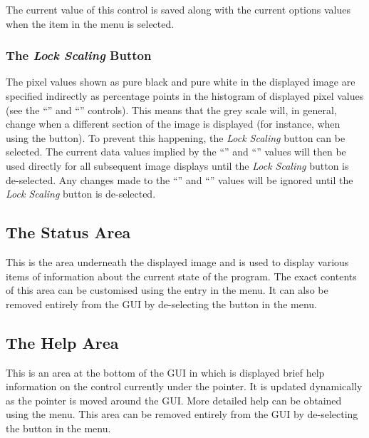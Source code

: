 The current value of this control is saved along with the current options
values when the  item in
the  menu is selected.

\subsubsection {The {\em Lock Scaling} Button}
The pixel values shown as pure black and pure white in the displayed
image are specified indirectly as percentage points in the histogram of
displayed pixel values (see the ``'' and ``''
controls). This means that the grey scale will, in general, change when a
different section of the image is displayed (for instance, when using the
 button). To prevent this happening, the
{\em Lock Scaling} button can be selected. The current data values
implied by the ``'' and
``'' values will then be used
directly for all subsequent image displays until the {\em Lock Scaling}
button is de-selected. Any changes made to the ``'' and ``''
values will be ignored until the {\em Lock Scaling} button is
de-selected.

\subsection {The Status Area}
This is the area underneath the displayed image and is used to display
various items of information about the current state of the program. The
exact contents of this area can be customised using the  entry in the  menu. It can also be removed entirely from
the GUI by de-selecting the  button in the  menu.

\subsection {The Help Area}
This is an area at the bottom of the GUI in which is displayed brief help
information on the control currently under the pointer. It is updated
dynamically as the pointer is moved around the GUI. More detailed help
can be obtained using the  menu.
This area can be removed entirely from the GUI by de-selecting the
 button in the
 menu.

